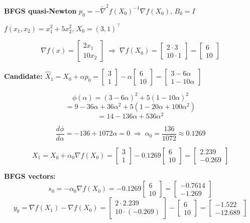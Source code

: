 \documentclass[10pt,a3paper]{article}
\begin{document}
\begin{minipage}[t]{0.46\linewidth}
\textbf{BFGS quasi-Newton} \quad $p_0 = -\tilde{\nabla}^2 f(X_0)^{-1}\nabla f(X_0)$,\; $B_0=I$

$f(x_1,x_2)=x_1^2+5x_2^2$,\; $X_0=(3,1)^\top$

\[
  \nabla f(x)=\begin{bmatrix}2x_1\\10x_2\end{bmatrix}
  \;\Rightarrow\;
  \nabla f(X_0)=\begin{bmatrix}2\cdot3\\10\cdot1\end{bmatrix}=\begin{bmatrix}6\\10\end{bmatrix}
\]

\textbf{Candidate:} $\hat{X}_1 = X_0+\alpha p_0 = \begin{bmatrix}3\\1\end{bmatrix}-\alpha\begin{bmatrix}6\\10\end{bmatrix} = \begin{bmatrix}3-6\alpha\\1-10\alpha\end{bmatrix}$

\[
  \phi(\alpha)=(3-6\alpha)^2+5(1-10\alpha)^2
\]
\[
  = 9-36\alpha+36\alpha^2+5(1-20\alpha+100\alpha^2)
\]
\[
  = 14-136\alpha+536\alpha^2
\]

\[
  \frac{d\phi}{d\alpha}=-136+1072\alpha=0
  \;\Rightarrow\; \alpha_0=\frac{136}{1072}\approx0.1269
\]

\[
  X_1 = X_0+\alpha_0\nabla f(X_0)
      = \begin{bmatrix}3\\1\end{bmatrix}-0.1269\begin{bmatrix}6\\10\end{bmatrix}
      = \begin{bmatrix}2.239\\-0.269\end{bmatrix}
\]

\textbf{BFGS vectors:}
\[
  s_0 = -\alpha_0\nabla f(X_0) = -0.1269\begin{bmatrix}6\\10\end{bmatrix}
      = \begin{bmatrix}-0.7614\\-1.269\end{bmatrix}
\]
\[
  y_0 = \nabla f(X_1)-\nabla f(X_0)
      = \begin{bmatrix}2\cdot2.239\\10\cdot(-0.269)\end{bmatrix}-\begin{bmatrix}6\\10\end{bmatrix}
      = \begin{bmatrix}-1.522\\-12.689\end{bmatrix}
\]


\end{minipage}
\end{document}
